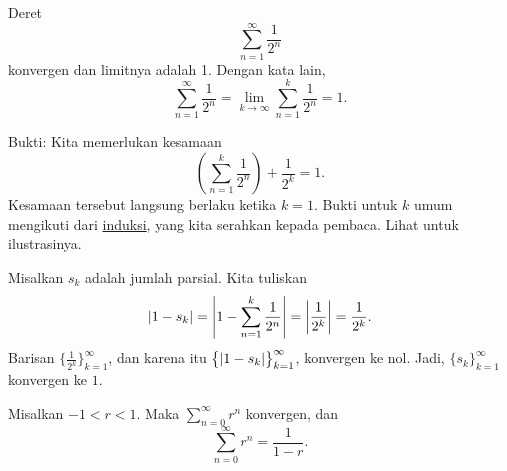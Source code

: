 \begin{example}
Deret
\begin{equation*}
\sum_{n=1}^\infty \frac{1}{2^n}
\end{equation*}
konvergen dan limitnya adalah 1.  Dengan kata lain,
\begin{equation*}
\sum_{n=1}^\infty \frac{1}{2^n} = 
\lim_{k\to\infty} \sum_{n=1}^k \frac{1}{2^n} = 
1 .
\end{equation*}

Bukti: Kita memerlukan kesamaan
\begin{equation*}
\left( \sum_{n=1}^k \frac{1}{2^n} \right)
+ \frac{1}{2^k}
= 1 .
\end{equation*}
Kesamaan tersebut langsung berlaku ketika $k=1$.  Bukti untuk $k$ umum
mengikuti dari \hyperref[induction:thm]{induksi}, yang kita serahkan kepada
pembaca.  Lihat  untuk ilustrasinya.
\begin{myfigureht}
\caption{Kesamaan 
$\left( \sum_{n=1}^k \frac{1}{2^n} \right)
+ \frac{1}{2^k}
= 1$ yang diilustrasikan untuk $k=3$.\label{figcutseries}}
\end{myfigureht}

Misalkan $s_k$ adalah jumlah parsial.  Kita tuliskan
\begin{equation*}
\lvert {
1 - s_k 
} \rvert
=
\left\lvert {
1 - 
\sum_{n=1}^k \frac{1}{2^n}
} \right\rvert
=
\left\lvert {\frac{1}{2^k}} \right\rvert = 
\frac{1}{2^k} .
\end{equation*}
Barisan $\bigl\{ \frac{1}{2^k} \bigr\}_{k=1}^\infty$, dan
karena itu $\bigl\{ \lvert {1-s_k} \rvert \bigr\}_{k=1}^\infty$,
konvergen ke nol.  Jadi, $\{ s_k \}_{k=1}^\infty$ konvergen ke $1$.
\end{example}

\begin{prop} \label{geometric:prop}
Misalkan
$-1 < r < 1$.  Maka \emph{}
$\sum_{n=0}^\infty r^n$ konvergen, dan
\begin{equation*}
\sum_{n=0}^\infty r^n = \frac{1}{1-r} .
\end{equation*}
\end{prop}

